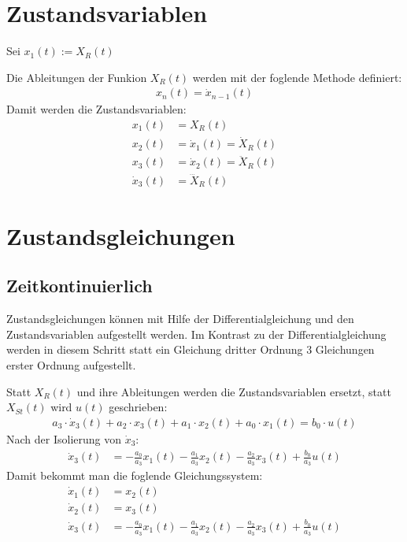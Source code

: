 \documentclass[fleqn,12pt]{article}
\begin{document}
\section{Zustandsvariablen}
Sei $x_1(t) := X_R(t)$

Die Ableitungen der Funkion $X_R(t)$ werden mit der foglende Methode definiert:
\begin{align*}
  x_n(t) = \dot{x}_{n - 1}(t)
\end{align*}
Damit werden die Zustandsvariablen:
\begin{align*}
  x_1(t) &= X_R(t) \\
  x_2(t) &= \dot{x}_1(t) = \dot{X}_R(t)\\
  x_3(t) &= \dot{x}_2(t) = \ddot{X}_R(t)\\
  \dot{x}_3(t) &= \dddot{X}_R(t)
\end{align*}

\section{Zustandsgleichungen}
\subsection{Zeitkontinuierlich}
Zustandsgleichungen können mit Hilfe der Differentialgleichung und den Zustandsvariablen aufgestellt werden. Im Kontrast zu der Differentialgleichung werden in diesem Schritt statt ein Gleichung dritter Ordnung 3 Gleichungen erster Ordnung aufgestellt.

Statt $X_R(t)$ und ihre Ableitungen werden die Zustandsvariablen ersetzt, statt $X_{St}(t)$ wird $u(t)$ geschrieben:
\begin{align*}
  a_3 \cdot \dot{x}_3(t) + a_2 \cdot x_3(t) + a_1 \cdot x_2(t) + a_0 \cdot x_1(t) = b_0 \cdot u(t)
\end{align*}
Nach der Isolierung von $\dot{x}_3$:
\begin{align*}
  \dot{x}_3(t) &= -\frac{a_0}{a_3}x_1(t) -\frac{a_1}{a_3}x_2(t) -\frac{a_2}{a_3}x_3(t) + \frac{b_0}{a_3}u(t)
\end{align*}
Damit bekommt man die foglende Gleichungssystem:
\begin{align}
  \dot{x}_1(t) &= x_2(t) \\
  \dot{x}_2(t) &= x_3(t) \\
  \dot{x}_3(t) &= -\frac{a_0}{a_3}x_1(t) -\frac{a_1}{a_3}x_2(t) -\frac{a_2}{a_3}x_3(t) + \frac{b_0}{a_3}u(t)
\end{align}
\end{document}
